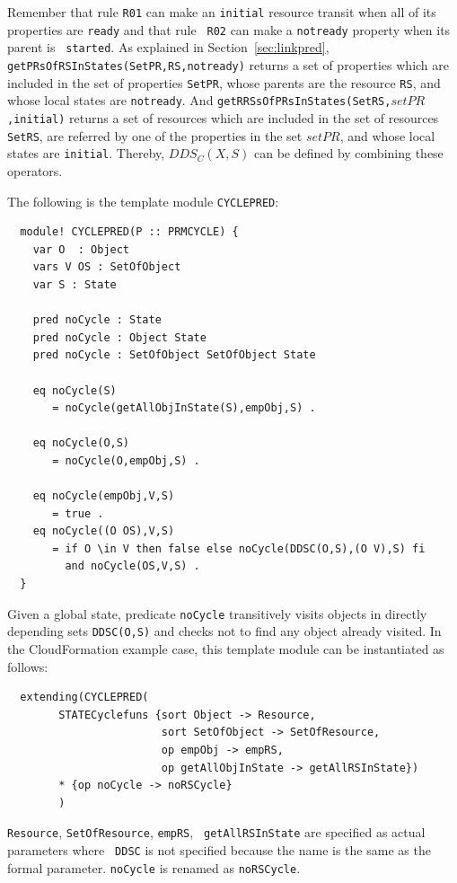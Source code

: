 \documentclass[12pt]{report}
\newcommand{\stt}[1]{{\small{\tt {#1}}}}
\begin{document}
\normalsize
Remember that rule {\tt R01} can make an {\tt initial} resource
transit when all of its properties are {\tt ready} and that rule {\tt
  R02} can make a {\tt notready} property when its parent is {\tt
  started}. As explained in Section~\ref{sec:linkpred},
\stt{getPRsOfRSInStates(SetPR,RS,notready)} returns a set of
properties which are included in the set of properties {\tt SetPR},
whose parents are the resource {\tt RS}, and whose local states are
{\tt notready}. And \stt{getRRSsOfPRsInStates(SetRS,$setPR$,initial)}
returns a set of resources which are included in the set of resources
{\tt SetRS}, are referred by one of the properties in the set $setPR$,
and whose local states are {\tt initial}. Thereby, $DDS_C(X,S)$ can be
defined by combining these operators.

The following is the template module {\tt CYCLEPRED}:
\small
\begin{verbatim}
  module! CYCLEPRED(P :: PRMCYCLE) {
    var O  : Object
    vars V OS : SetOfObject
    var S : State
  
    pred noCycle : State
    pred noCycle : Object State
    pred noCycle : SetOfObject SetOfObject State
  
    eq noCycle(S)
       = noCycle(getAllObjInState(S),empObj,S) .
  
    eq noCycle(O,S)
       = noCycle(O,empObj,S) .
  
    eq noCycle(empObj,V,S)
       = true .
    eq noCycle((O OS),V,S)
       = if O \in V then false else noCycle(DDSC(O,S),(O V),S) fi
         and noCycle(OS,V,S) .
  }
\end{verbatim}
\normalsize
Given a global state, predicate {\tt noCycle} transitively visits
objects in directly depending sets \stt{DDSC(O,S)} and checks not to
find any object already visited. In the CloudFormation example case,
this template module can be instantiated as follows:
\small
\begin{verbatim}
  extending(CYCLEPRED(
        STATECyclefuns {sort Object -> Resource,
                        sort SetOfObject -> SetOfResource,
                        op empObj -> empRS,
                        op getAllObjInState -> getAllRSInState})
        * {op noCycle -> noRSCycle}
        )
\end{verbatim}
\normalsize
 {\tt Resource}, {\tt SetOfResource}, {\tt empRS}, {\tt
   getAllRSInState} are specified as actual parameters where {\tt
   DDSC} is not specified because the name is the same as the formal
 parameter.  {\tt noCycle} is renamed as {\tt noRSCycle}.
\end{document}
